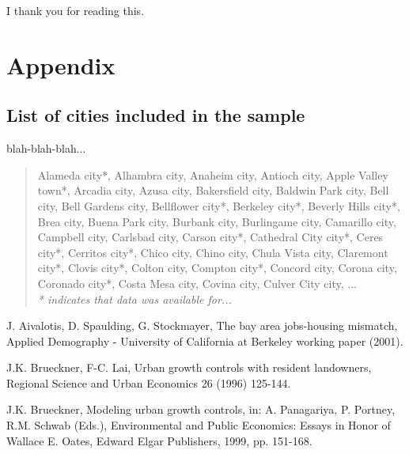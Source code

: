 \documentclass[12pt]{article}%
\begin{document}
I thank you for reading this.

\appendix
\section*{Appendix}

\subsection*{List of cities included in the sample}

blah-blah-blah...

\footnotesize
\begin{quotation}
\noindent Alameda city*, Alhambra city, Anaheim city, Antioch city, Apple Valley town*, Arcadia city, Azusa city, Bakersfield city, Baldwin Park city, Bell city, Bell Gardens city, Bellflower city*, Berkeley city*, Beverly Hills city*, Brea city, Buena Park city, Burbank city, Burlingame city, Camarillo city, Campbell city, Carlsbad city, Carson city*, Cathedral City city*, Ceres city*, Cerritos city*, Chico city, Chino city, Chula Vista city, Claremont city*, Clovis city*, Colton city, Compton city*, Concord city, Corona city, Coronado city*, Costa Mesa city, Covina city, Culver City city, ... \\ \textit{* indicates that data was available for...}
\end{quotation}


\normalsize






\begin{thebibliography}{9} 
J. Aivalotis, D. Spaulding, G. Stockmayer, The bay area
jobs-housing mismatch, Applied Demography - University of California at
Berkeley working paper (2001).

J.K. Brueckner, F-C. Lai, Urban growth controls with resident
landowners, Regional Science and Urban Economics 26 (1996) 125-144.

J.K. Brueckner, Modeling urban growth controls, in: A.
Panagariya, P. Portney, R.M. Schwab (Eds.), Environmental and Public
Economics: Essays in Honor of Wallace E. Oates, Edward Elgar Publishers, 1999, pp. 151-168.

\end{thebibliography}
\end{document}
